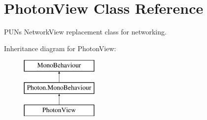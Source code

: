 \hypertarget{class_photon_view}{}\section{Photon\+View Class Reference}
\label{class_photon_view}


P\+UN\textquotesingle{}s Network\+View replacement class for networking.  


Inheritance diagram for Photon\+View\+:\begin{figure}[H]
\begin{center}
\leavevmode
\includegraphics[height=3.000000cm]{class_photon_view}
\end{center}
\end{figure}
